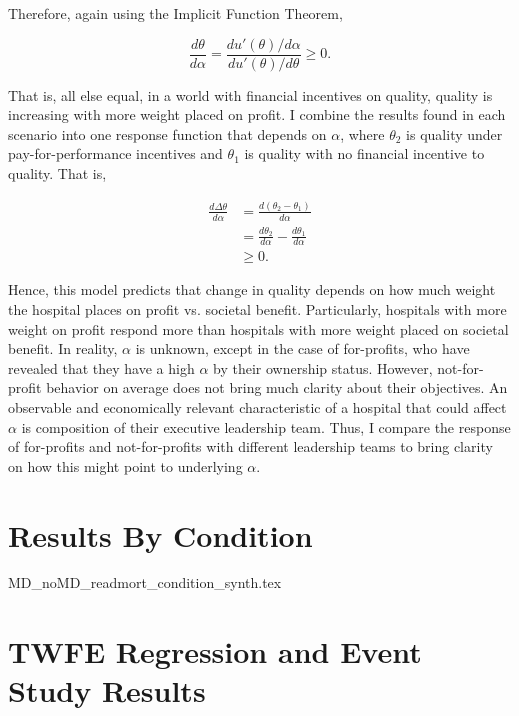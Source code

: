 \documentclass[12pt]{article}
\begin{document}
    Therefore, again using the Implicit Function Theorem,

    $$\frac{d\theta}{d\alpha} = \frac{du'(\theta)/d\alpha}{du'(\theta)/d\theta}\geq0.$$

    That is, all else equal, in a world with financial incentives on quality, quality is increasing with more weight placed on profit. I combine the results found in each scenario into one response function that depends on $\alpha$, where $\theta_2$ is quality under pay-for-performance incentives and $\theta_1$ is quality with no financial incentive to quality. That is, 

    \begin{align*}
        \frac{d\Delta\theta}{d\alpha}&=\frac{d(\theta_2-\theta_1)}{d\alpha}\\
        &=\frac{d\theta_2}{d\alpha}-\frac{d\theta_1}{d\alpha}\\
        &\geq 0.
    \end{align*}


    Hence, this model predicts that change in quality depends on how much weight the hospital places on profit vs. societal benefit. Particularly, hospitals with more weight on profit respond more than hospitals with more weight placed on societal benefit. In reality, $\alpha$ is unknown, except in the case of for-profits, who have revealed that they have a high $\alpha$ by their ownership status. However, not-for-profit behavior on average does not bring much clarity about their objectives. An observable and economically relevant characteristic of a hospital that could affect $\alpha$ is composition of their executive leadership team. Thus, I compare the response of for-profits and not-for-profits with different leadership teams to bring clarity on how this might point to underlying $\alpha$.


\section{Results By Condition}\label{app:condition}


{MD_noMD_readmort_condition_synth.tex}

\section{TWFE Regression and Event Study Results}\label{app:fullsample}
\end{document}

